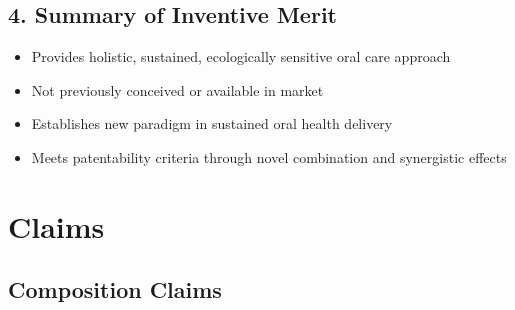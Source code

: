 \documentclass[12pt]{article}
\begin{document}
\subsection*{4. Summary of Inventive Merit}
\begin{itemize}
    \item Provides holistic, sustained, ecologically sensitive oral care approach
    \item Not previously conceived or available in market
    \item Establishes new paradigm in sustained oral health delivery
    \item Meets patentability criteria through novel combination and synergistic effects
\end{itemize}

\section*{Claims}

\subsection*{Composition Claims}
\end{document}
